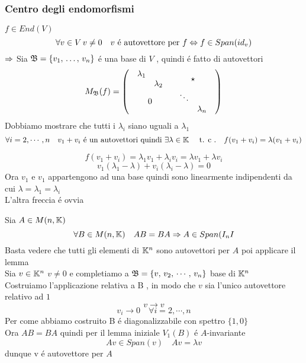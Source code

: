 \subsubsection{Centro degli endomorfismi}
\begin{lem} $f\in End(V) $ $$ \forall v \in V \, v \neq 0 \quad v \text{ \'e autovettore per } f \Leftrightarrow f \in Span(id_v) $$
\proof $\Rightarrow$ Sia $\mathfrak{B} = \{ v_1, \, \dots , \, v_n \} $ \'e una base di $V$ , quindi \'e fatto di autovettori
$$ M_{\mathfrak{B}}(f) = \left( \begin{array}{cc} \begin{array}{cc} \lambda_1 &  \\ & \lambda_2 \end{array} & \star \\  0 &  \begin{array}{cc} \ddots &  \\ & \lambda_n \end{array} \end{array}\right)
$$
Dobbiamo mostrare che tutti i $\lambda_i$ siano uguali a $\lambda_1$\\
$$\forall i=2,\cdots, n  \quad v_1+v_i  \text{ \'e un autovettori quindi }\exists \lambda \in \mathbb{K} \quad \text{ t. c .} \quad f(v_1+v_i)=\lambda(v_1+v_i)$$

$$  f(v_1+v_i) = \lambda_1 v_1 + \lambda_i v_i = \lambda v_1 + \lambda v_i$$
$$ v_1 ( \lambda_1 - \lambda ) + v_i ( \lambda_i -\lambda ) =0  $$
Ora $v_1$ e $v_1$ appartengono ad una base quindi sono linearmente indipendenti da cui $\lambda=\lambda_1=\lambda_i $\\
L'altra freccia \'e ovvia
\endproof
\end{lem}
\spazio
\begin{prop}
Sia $ A \in M(n,\mathbb{K}) $ 
$$ \forall B \in M(n,\mathbb{K}) \quad AB=BA \Rightarrow A \in Span(I_nI$$
\proof
Basta vedere che tutti gli elementi di $\mathbb{K}^n $ sono autovettori per $A$ poi applicare il lemma\\
Sia $v \in \mathbb{K}^n $ $ v\neq 0 $ e completiamo a $\mathfrak{B} =\{ v, \, v_2, \, \cdots , \, v_n \} $ base di $\mathbb{K}^n $ \\
Costruiamo l'applicazione relativa a B , in modo che $v$ sia l'unico autovettore relativo ad $1$
$$ v \to v $$
$$ v_i \to 0 \quad \forall i=2,\cdots , n $$
Per come abbiamo costruito B \'e diagonalizzabile con spettro $\{ 1, 0 \} $\\
Ora $AB=BA$ quindi per il lemma iniziale $V_1(B) $ \'e $A$-invariante 
$$ Av \in Span(v) \quad Av=\lambda v $$ 
dunque v \'e autovettore per $A$
\endproof
\end{prop}
%

